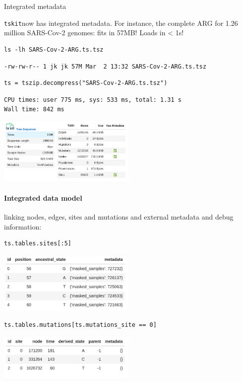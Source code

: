 \documentclass[landscape,a0paper,fontscale=0.4]{baposter}
\newcommand{\tskit}{{\texttt{tskit}}}
\begin{document}
\begin{poster}
\begin{posterbox}[name=inout,column=0,span=1]{Integrated metadata}

    \tskit now has integrated metadata.
    For instance,
    the complete ARG for 1.26 million SARS-Cov-2 genomes: fits in 57MB!
    Loads in < 1s!

\begin{verbatim}
ls -lh SARS-Cov-2-ARG.ts.tsz
\end{verbatim}
{\scriptsize \verb|-rw-rw-r-- 1 jk jk 57M Mar  2 13:32 SARS-Cov-2-ARG.ts.tsz|}
\begin{verbatim}
ts = tszip.decompress("SARS-Cov-2-ARG.ts.tsz")
\end{verbatim}
{\scriptsize
\begin{verbatim}
CPU times: user 775 ms, sys: 533 ms, total: 1.31 s
Wall time: 842 ms
\end{verbatim}
}
\includegraphics[width=0.5\textwidth]{sc2_ts.png}

\paragraph{Integrated data model} linking nodes, edges, sites and mutations and external metadata and debug information:

\begin{multicols}{2}
\begin{verbatim}
ts.tables.sites[:5]
\end{verbatim}
\includegraphics[width=0.5\textwidth]{sc2_sites}

\begin{verbatim}
ts.tables.mutations[ts.mutations_site == 0]
\end{verbatim}
\includegraphics[width=0.5\textwidth]{sc2_muts}
\end{multicols}


\end{posterbox}
\end{poster}
\end{document}
